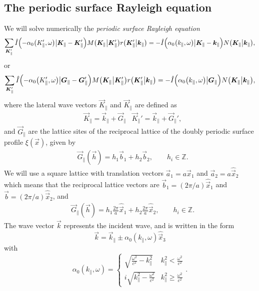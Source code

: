 \subsection*{The periodic surface Rayleigh equation}
We will solve numerically the \emph{periodic surface Rayleigh equation}
\begin{equation}
    \sum_{\vec K_{\|}'} \hat I\del[2]{-\alpha_0 \del[1]{K_{\|}', \omega} \big\vert \vec K_{\|} - \vec K_{\|}'} M\del[1]{\vec K_{\|} \big\vert \vec K_{\|}'} r\del[1]{\vec K_{\|}' \big\vert \vec k_{\|}} 
    = -\hat I \del[2]{\alpha_0 \del[1]{k_{\|}, \omega} \big\vert \vec K_{\|} - \vec k_{\|}} N\del[1]{\vec K_{\|} \big\vert \vec k_{\|}},
    \label{eq:rayleigh}
\end{equation}
or
\begin{equation}
    \sum_{\vec K_{\|}'} \hat I\del[2]{-\alpha_0 \del[1]{K_{\|}', \omega} \big\vert \vec G_{\|} - \vec G_{\|}'} M\del[1]{\vec K_{\|} \big\vert \vec K_{\|}'} r\del[1]{\vec K_{\|}' \big\vert \vec k_{\|}} 
    = -\hat I \del[2]{\alpha_0 \del[1]{k_{\|}, \omega} \big\vert \vec G_{\|}} N\del[1]{\vec K_{\|} \big\vert \vec k_{\|}},
\end{equation}
where the lateral wave vectors $\vec K_{\|}$ and $\vec K_{\|}$ are defined as
\begin{align}
    &\vec K_{\|} = \vec k_{\|} + \vec G_{\|} &\vec K_{\|}' = \vec k_{\|} + \vec G_{\|}',
\end{align}
and $\vec G_{\|}$ are the lattice sites of the reciprocal lattice of the doubly periodic surface profile $\xi(\vec x)$, given by
\begin{align}
    &\vec G_{\|} (\vec h) = h_1 \vec b_1 + h_2 \vec b_2, \qquad h_i \in \mathbb{Z}.
\end{align}
We will use a square lattice with translation vectors $\vec a_1 = a \hat {\vec x}_1$ and $\vec a_2 = a\hat{\vec x}_2$ which means that the reciprocal lattice vectors are $\vec b_1 = (2\pi/a)\hat{\vec x}_1$ and $\vec b=(2\pi/a)\hat{\vec x}_2$, and
\begin{align}
    &\vec G_{\|} (\vec h) = h_1 \frac{2\pi}{a} \hat{\vec x}_1 + h_2 \frac{2\pi}{a} \hat{\vec x}_2, \qquad h_i \in \mathbb{Z}.
\end{align}
The wave vector $\vec k$ represents the incident wave, and is written in the form
\begin{equation}
    \vec k = \vec k_\| \pm \alpha_0(k_\|, \omega)\hat {\vec x}_3
\end{equation}
with
\begin{equation}
    \alpha_0(k_\|, \omega) =
    \begin{cases}
        \sqrt{\frac{\omega^2}{c^2} - k_\|^2} &k_\|^2 < \frac{\omega^2}{c^2} \\
        i\sqrt{k_\|^2 - \frac{\omega^2}{c^2}} &k_\|^2 \geq \frac{\omega^2}{c^2}
    \end{cases}.
\end{equation}
